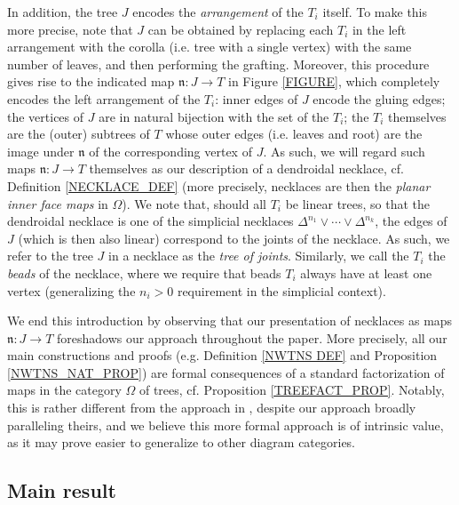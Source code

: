 \documentclass[a4paper,10pt
,draft
]{article}%
\numberwithin{equation}{section}
\numberwithin{figure}{section}
\theoremstyle{definition} %
\newcommand{\1}{\ensuremath{\mathbbm 1}}%
\begin{document}
In addition, the tree $J$ encodes the \emph{arrangement}
of the $T_i$ itself. 
To make this more precise,
note that $J$ can be obtained by replacing each $T_i$ 
in the left arrangement with the corolla (i.e. tree with a single vertex) with the same number of leaves,
and then performing the grafting.
Moreover, this procedure gives rise to the indicated map
$\mathfrak{n} \colon J \to T$
in Figure \ref{FIGURE},
which completely encodes the left arrangement of the $T_i$: 
inner edges of $J$ encode the gluing edges;
the vertices of $J$ are in natural bijection with the set of the $T_i$; the $T_i$ themselves are the (outer) subtrees of $T$ whose outer edges (i.e. leaves and root)
are the image under $\mathfrak{n}$
of the corresponding vertex of $J$.
As such, we will regard such maps 
$\mathfrak{n} \colon J \to T$ themselves 
as our description of a dendroidal necklace,
cf. Definition \ref{NECKLACE_DEF}
(more precisely, necklaces are then the 
\emph{planar inner face maps} in $\Omega$).
We note that, should all $T_i$ be linear trees, so that the dendroidal necklace is one of the simplicial necklaces
$\Delta^{n_1} \vee \cdots \vee \Delta^{n_k}$,
the edges of $J$ (which is then also linear) correspond to the joints of the necklace. 
As such, we refer to the tree $J$ in a necklace as the 
\emph{tree of joints}. Similarly, we call the $T_i$ the \emph{beads} of the necklace, where we require that beads $T_i$ always have at least one vertex (generalizing the $n_i>0$ requirement in the simplicial context).

We end this introduction by observing that our presentation of necklaces as maps $\mathfrak{n} \colon J \to T$
foreshadows our approach throughout the paper.
More precisely, all our main constructions and proofs
(e.g. Definition \ref{NWTNS DEF} and
Proposition \ref{NWTNS_NAT_PROP})
are formal consequences of a standard factorization of maps in the category $\Omega$ of trees, cf. Proposition \ref{TREEFACT_PROP}.
Notably, this is rather different from the approach in \cite{DS11},
despite our approach broadly paralleling theirs,
and we believe this more formal approach is of intrinsic value,
as it may prove easier to generalize to other diagram categories.




\subsection{Main result}
\label{MAINRESULT_SEC}
\end{document}
